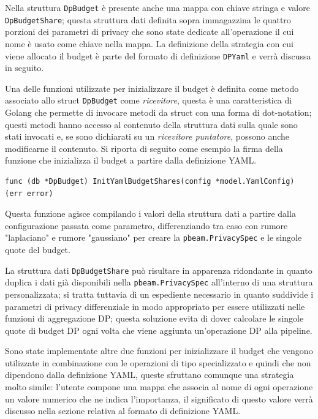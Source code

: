 Nella struttura \texttt{DpBudget} è presente anche una mappa con chiave stringa e valore \texttt{DpBudgetShare}; questa struttura dati definita sopra immagazzina le quattro porzioni dei parametri di privacy che sono state dedicate all'operazione il cui nome è usato come chiave nella mappa. La definizione della strategia con cui viene allocato il budget è parte del formato di definizione \texttt{DPYaml} e verrà discussa in seguito.

Una delle funzioni utilizzate per inizializzare il budget è definita come metodo associato allo struct \texttt{DpBudget} come \textit{ricevitore}, questa è una caratteristica di Golang che permette di invocare metodi da struct con una forma di dot-notation; questi metodi hanno accesso al contenuto della struttura dati sulla quale sono stati invocati e, se sono dichiarati su un \textit{ricevitore puntatore}, possono anche modificarne il contenuto. Si riporta di seguito come esempio la firma della funzione che inizializza il budget a partire dalla definizione YAML.
\begin{verbatim}
func (db *DpBudget) InitYamlBudgetShares(config *model.YamlConfig) (err error)
\end{verbatim}
Questa funzione agisce compilando i valori della struttura dati a partire dalla configurazione passata come parametro, differenziando tra caso con rumore "laplaciano" e rumore "gaussiano" per creare la \texttt{pbeam.PrivacySpec} e le singole quote del budget. 

La struttura dati \texttt{DpBudgetShare} può risultare in apparenza ridondante in quanto duplica i dati già disponibili nella \texttt{pbeam.PrivacySpec} all'interno di una struttura personalizzata; si tratta tuttavia di un espediente necessario in quanto suddivide i parametri di privacy differenziale in modo appropriato per essere utilizzati nelle funzioni di aggregazione DP; questa soluzione evita di dover calcolare le singole quote di budget DP ogni volta che viene aggiunta un'operazione DP alla pipeline.

Sono state implementate altre due funzioni per inizializzare il budget che vengono utilizzate in combinazione con le operazioni di tipo specializzato e quindi che non dipendono dalla definizione YAML, queste sfruttano comunque una strategia molto simile: l'utente compone una mappa che associa al nome di ogni operazione un valore numerico che ne indica l'importanza, il significato di questo valore verrà discusso nella sezione relativa al formato di definizione YAML.

